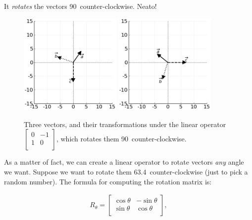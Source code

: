 It \textit{rotates} the vectors 90\textdegree\ counter-clockwise. Neato!

\begin{figure}[ht]
\centering
\vspace{.2in}
\includegraphics[width=0.44\textwidth]{preoperators.png}
\includegraphics[width=0.44\textwidth]{rotate90op.png}
\caption[.]{Three vectors, and their transformations under the linear operator 
{\scriptsize $\begin{bmatrix} 0 & -1 \\ 1 & 0 \\
\end{bmatrix}$,} which rotates them 90\textdegree\ counter-clockwise.}
\label{fig:rotate90op}
\end{figure}

\pagebreak
{}

As a matter of fact, we can create a linear operator to rotate vectors
\textit{any} angle we want. Suppose we want to rotate them 63.4\textdegree\ 
counter-clockwise (just to pick a random number). The formula for computing the
rotation matrix is:

\vspace{-.15in}
\begin{align*}
R_{\theta} =
\begin{bmatrix}
\cos \theta & -\sin \theta \\
\sin \theta & \cos \theta \\
\end{bmatrix},
\end{align*}
\vspace{-.15in}

